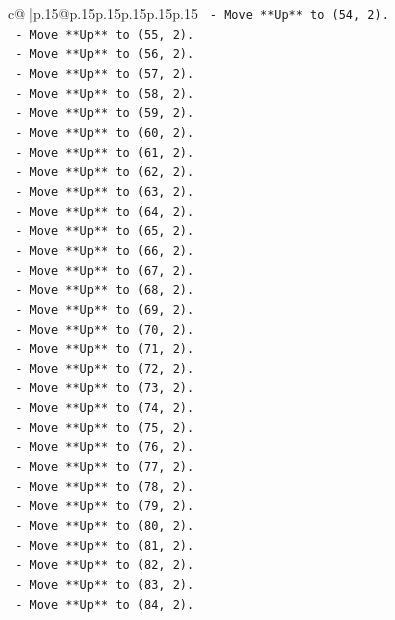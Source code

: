 \documentclass{article}
\begin{document}
{\begin{supertabular}{c@{$\;$}|p{.15\linewidth}@{}p{.15\linewidth}p{.15\linewidth}p{.15\linewidth}p{.15\linewidth}p{.15\linewidth}}
{{{\texttt{    {-} Move **Up** to (54, 2).} \\
\texttt{    {-} Move **Up** to (55, 2).} \\
\texttt{    {-} Move **Up** to (56, 2).} \\
\texttt{    {-} Move **Up** to (57, 2).} \\
\texttt{    {-} Move **Up** to (58, 2).} \\
\texttt{    {-} Move **Up** to (59, 2).} \\
\texttt{    {-} Move **Up** to (60, 2).} \\
\texttt{    {-} Move **Up** to (61, 2).} \\
\texttt{    {-} Move **Up** to (62, 2).} \\
\texttt{    {-} Move **Up** to (63, 2).} \\
\texttt{    {-} Move **Up** to (64, 2).} \\
\texttt{    {-} Move **Up** to (65, 2).} \\
\texttt{    {-} Move **Up** to (66, 2).} \\
\texttt{    {-} Move **Up** to (67, 2).} \\
\texttt{    {-} Move **Up** to (68, 2).} \\
\texttt{    {-} Move **Up** to (69, 2).} \\
\texttt{    {-} Move **Up** to (70, 2).} \\
\texttt{    {-} Move **Up** to (71, 2).} \\
\texttt{    {-} Move **Up** to (72, 2).} \\
\texttt{    {-} Move **Up** to (73, 2).} \\
\texttt{    {-} Move **Up** to (74, 2).} \\
\texttt{    {-} Move **Up** to (75, 2).} \\
\texttt{    {-} Move **Up** to (76, 2).} \\
\texttt{    {-} Move **Up** to (77, 2).} \\
\texttt{    {-} Move **Up** to (78, 2).} \\
\texttt{    {-} Move **Up** to (79, 2).} \\
\texttt{    {-} Move **Up** to (80, 2).} \\
\texttt{    {-} Move **Up** to (81, 2).} \\
\texttt{    {-} Move **Up** to (82, 2).} \\
\texttt{    {-} Move **Up** to (83, 2).} \\
\texttt{    {-} Move **Up** to (84, 2).} \\
}}}
\end{supertabular}}
\end{document}
